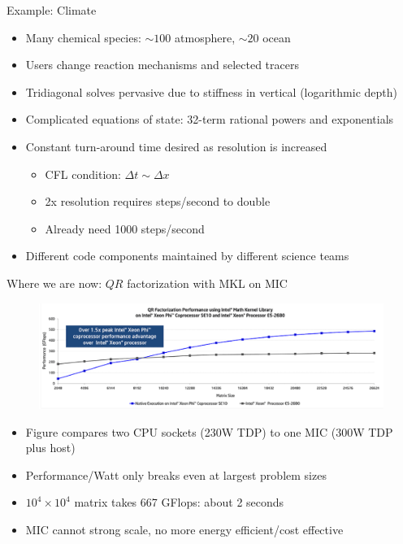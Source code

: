 \documentclass{beamer}
\begin{document}
\begin{frame}{Example: Climate}
  \begin{itemize}
  \item Many chemical species: $\sim 100$ atmosphere, $\sim 20$ ocean
  \item Users change reaction mechanisms and selected tracers
  \item Tridiagonal solves pervasive due to stiffness in vertical (logarithmic depth)
  \item Complicated equations of state: 32-term rational powers and exponentials
  \item Constant turn-around time desired as resolution is increased
    \begin{itemize}
    \item CFL condition: $\Delta t \sim \Delta x$
    \item 2x resolution requires steps/second to double
    \item Already need 1000 steps/second
    \end{itemize}
  \item Different code components maintained by different science teams
  \end{itemize}
\end{frame}

\begin{frame}{Where we are now: $QR$ factorization with MKL on MIC}
  \begin{figure}
    \centering
    \includegraphics[width=\textwidth]{figures/hardware/MKL-dgeqrf-MIC}
  \end{figure}
  \begin{itemize}
  \item Figure compares two CPU sockets (230W TDP) to one MIC (300W TDP plus host)
  \item Performance/Watt only breaks even at largest problem sizes
  \item $10^4 \times 10^4$ matrix takes 667 GFlops: about 2 seconds
  \item MIC cannot strong scale, no more energy efficient/cost effective
  \end{itemize}
\end{frame}
\end{document}
